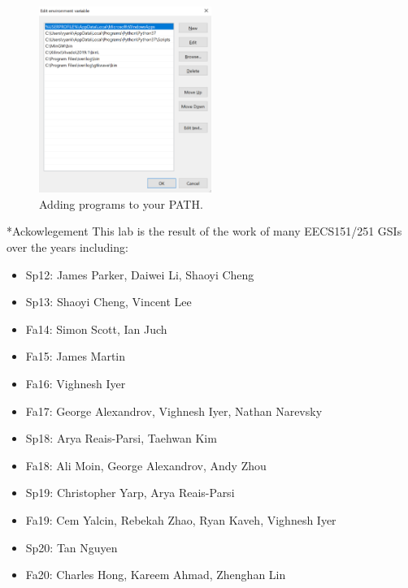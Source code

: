\documentclass[11pt]{article}
\makeatletter
\renewcommand{\section}
{\@startsection {section}{1}{0pt}
 {-2ex}
 {1ex}
 {\bfseries\Large}}
\makeatother
\begin{document}
\begin{figure}[ht]
  \centering
  \includegraphics[width=0.5\textwidth]{figs/environment_variables_3.png}
  \caption{Adding programs to your PATH.}
  \label{fig:envVars3}
\end{figure}
\newpage
\section*{Ackowlegement}
This lab is the result of the work of many EECS151/251 GSIs over the years including:
\begin{itemize}
\item Sp12: James Parker, Daiwei Li, Shaoyi Cheng
\item Sp13: Shaoyi Cheng, Vincent Lee
\item Fa14: Simon Scott, Ian Juch
\item Fa15: James Martin
\item Fa16: Vighnesh Iyer
\item Fa17: George Alexandrov, Vighnesh Iyer, Nathan Narevsky
\item Sp18: Arya Reais-Parsi, Taehwan Kim
\item Fa18: Ali Moin, George Alexandrov, Andy Zhou
\item Sp19: Christopher Yarp, Arya Reais-Parsi
\item Fa19: Cem Yalcin, Rebekah Zhao, Ryan Kaveh, Vighnesh Iyer
\item Sp20: Tan Nguyen
\item Fa20: Charles Hong, Kareem Ahmad, Zhenghan Lin
\end{itemize}
\end{document}
